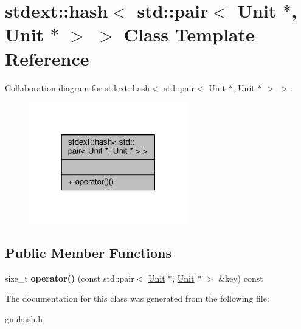 \hypertarget{classstdext_1_1hash_3_01std_1_1pair_3_01Unit_01_5_00_01Unit_01_5_01_4_01_4}{}\section{stdext\+:\+:hash$<$ std\+:\+:pair$<$ Unit $\ast$, Unit $\ast$ $>$ $>$ Class Template Reference}
\label{classstdext_1_1hash_3_01std_1_1pair_3_01Unit_01_5_00_01Unit_01_5_01_4_01_4}


Collaboration diagram for stdext\+:\+:hash$<$ std\+:\+:pair$<$ Unit $\ast$, Unit $\ast$ $>$ $>$\+:
\nopagebreak
\begin{figure}[H]
\begin{center}
\leavevmode
\includegraphics[width=195pt]{db/d5e/classstdext_1_1hash_3_01std_1_1pair_3_01Unit_01_5_00_01Unit_01_5_01_4_01_4__coll__graph}
\end{center}
\end{figure}
\subsection*{Public Member Functions}
\begin{DoxyCompactItemize}
\item 
size\+\_\+t {\bfseries operator()} (const std\+::pair$<$ \hyperlink{classUnit}{Unit} $\ast$, \hyperlink{classUnit}{Unit} $\ast$ $>$ \&key) const \hypertarget{classstdext_1_1hash_3_01std_1_1pair_3_01Unit_01_5_00_01Unit_01_5_01_4_01_4_adfe37280e74bb6ef39243fc2b20722b1}{}\label{classstdext_1_1hash_3_01std_1_1pair_3_01Unit_01_5_00_01Unit_01_5_01_4_01_4_adfe37280e74bb6ef39243fc2b20722b1}

\end{DoxyCompactItemize}


The documentation for this class was generated from the following file\+:\begin{DoxyCompactItemize}
\item 
gnuhash.\+h\end{DoxyCompactItemize}
